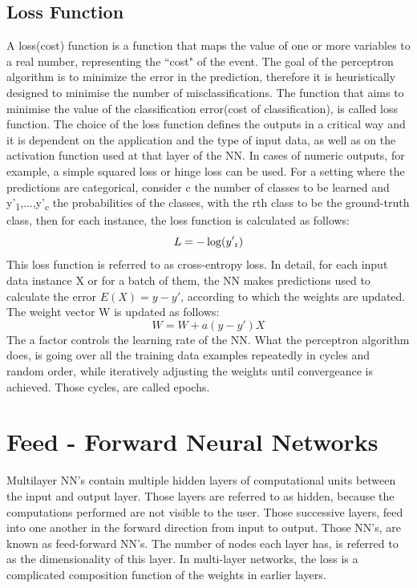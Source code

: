     \subsection{Loss Function}
    Α loss(cost) function is a function that maps the value of one or more variables to a real number, representing the ``cost" of the event.
    The goal of the perceptron algorithm is to minimize the error in the prediction, therefore it is heuristically designed to minimise the number of misclassifications. The function that aims to minimise the value of the classification error(cost of classification), is called loss function. The choice of the loss function defines the outputs in a critical way and it is dependent on the application and the type of input data, as well as on the activation function used at that layer of the NN. In cases of numeric outputs, for example, a simple squared loss or hinge loss can be used. For a setting where the predictions are categorical, consider c the number of classes to be learned and y'\textsubscript{1},...,y'\textsubscript{c} the probabilities of the classes, with the rth class to be the ground-truth class, then for each instance, the loss function is calculated as follows: 
    \begin{equation}
        L = -\log(y'\textsubscript{r})
    \end{equation}
    This loss function is referred to as cross-entropy loss. 
    In detail, for each input data instance X or for a batch of them, the NN makes predictions used to calculate the error $E(X) = y - y'$, according to which the weights are updated. 
    The weight vector W is updated as follows:
    \begin{equation}
        W = W + a ( y - y' ) X
    \end{equation}
    The a factor controls the learning rate of the NN. What the perceptron algorithm does, is going over all the training data examples repeatedly in cycles and random order, while iteratively adjusting the weights until convergeance is achieved. Those cycles, are called epochs.
    
    \section{Feed - Forward Neural Networks}
    Multilayer NN's contain multiple hidden layers of computational units between the input and output layer. Those layers are referred to as hidden, because the computations performed are not visible to the user. Those successive layers, feed into one another in the forward direction from input to output. Those NN's, are known as feed-forward NN's. The number of nodes each layer has, is referred to as the dimensionality of this layer. In multi-layer networks, the loss is a complicated composition function of the weights in earlier layers.
    
